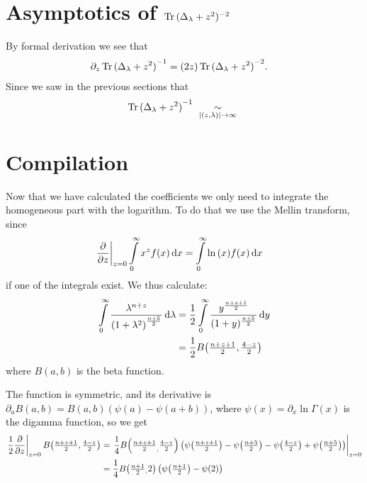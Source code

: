 \section{Asymptotics of $\Tr{(\Delta_\lambda + z^2)^{-2}}$}
By formal derivation we see that
\begin{align*}
    \partial_z\Tr{(\Delta_\lambda + z^2)}^{-1} &=
        (2z) \Tr{(\Delta_\lambda + z^2)}^{-2}
        .
\end{align*}
Since we saw in the previous sections that
\begin{align*}
    \Tr{(\Delta_\lambda + z^2)}^{-1}
        \ \SimAs{\left|(z,\lambda)\right|\to\infty}\ 
\end{align*}

\section{Compilation}
Now that we have calculated the coefficients we only need to integrate the
homogeneous part with the logarithm. To do that we use the Mellin transform,
since
\begin{align*}
    \left.\frac\partial{\partial z}\right|_{z=0}\Integ[\infty]{0}{x}{x^z f(x)}
    &= \Integ[\infty]{0}{x}{\ln{(x)} f(x)}
\end{align*}
if one of the integrals exist. We thus calculate:
\begin{align*}
    \Integ[\infty]{0}{\lambda}{\frac{\lambda^{n + z}}{\left(1 +
    \lambda^2\right)^{\frac{n+5}{2}}}} &=
    \frac12\Integ[\infty]{0}{y}{\frac{y^{\frac{n+z+1}{2}}}{(1 +
    y)^{\frac{n+5}{2}}}} \\
    &= \frac12 B\!\left(\tfrac{n+z+1}{2}, \tfrac{4-z}{2}\right)
\end{align*}
where $B(a,b)$ is the beta function. %

The function is symmetric, and its
derivative is $\partial_a B(a,b) = B(a,b) (\psi(a) - \psi(a+b))$, where
$\psi(x) = \partial_x \ln\Gamma(x)$ is the digamma function, so we get
\begin{align*}
    \left.\frac12\frac\partial{\partial z}\right|_{z=0} B\!\left(\tfrac{n+z+1}{2}, \tfrac{4-z}{2}\right)
    &= \left.\frac14 B\!\left(\tfrac{n+z+1}{2}_, \tfrac{4-z}{2}\right)
    \left(\psi\!\left(\tfrac{n+z+1}{2}\right) - \psi\!\left(\tfrac{n+5}{2}\right) -
    \psi\!\left(\tfrac{4-z}{2}\right) +
    \psi\!\left(\tfrac{n+5}{2}\right)\right)\right|_{z=0} \\
    &= \frac14 B\!\left(\tfrac{n+1}{2}\vphantom{\tfrac11}_, 2\right)
    \left(\psi\!\left(\tfrac{n+1}{2}\right) - \psi\!\left(2\right)\right)
\end{align*}

